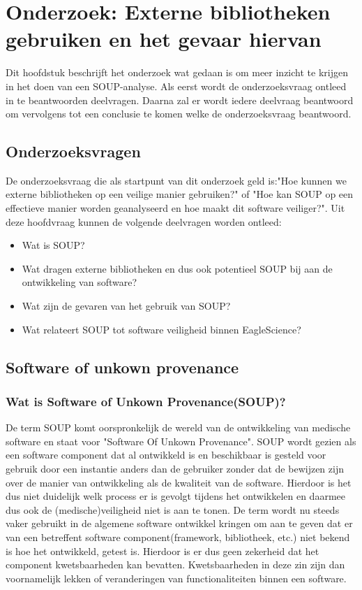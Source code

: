 \chapter{Onderzoek: Externe bibliotheken gebruiken en het gevaar hiervan}\label{ch:onderzoek:-SOUP-analyse}
Dit hoofdstuk beschrijft het onderzoek wat gedaan is om meer inzicht te krijgen in het doen van een SOUP-analyse. Als eerst wordt de onderzoeksvraag ontleed in te beantwoorden deelvragen. Daarna zal er wordt iedere deelvraag beantwoord om vervolgens tot een conclusie te komen welke de onderzoeksvraag beantwoord.

\section{Onderzoeksvragen} \label{sec:SOUPOnderzoeksvragen}
De onderzoeksvraag die als startpunt van dit onderzoek geld is:"Hoe kunnen we externe bibliotheken op een veilige manier gebruiken?" of "Hoe kan SOUP op een effectieve manier worden geanalyseerd en hoe maakt dit software veiliger?". Uit deze hoofdvraag kunnen de volgende deelvragen worden ontleed:
\begin{itemize}
    \item Wat is SOUP?
    \item Wat dragen externe bibliotheken en dus ook potentieel SOUP bij aan de ontwikkeling van software?
    \item Wat zijn de gevaren van het gebruik van SOUP?
    \item Wat relateert SOUP tot software veiligheid binnen EagleScience?
\end{itemize}


\section{Software of unkown provenance}\label{sec:software-of-unkown-provenance}

\subsection{Wat is Software of Unkown Provenance(SOUP)?}\label{subsec:wat-is-soup?2}
De term SOUP komt oorspronkelijk de wereld van de ontwikkeling van medische software en staat voor "Software Of Unkown Provenance".
SOUP wordt gezien als een software component dat al ontwikkeld is en beschikbaar is gesteld voor gebruik door een instantie anders dan de gebruiker zonder dat de bewijzen zijn over de manier van ontwikkeling als de kwaliteit van de software.
Hierdoor is het dus niet duidelijk welk process er is gevolgt tijdens het ontwikkelen en daarmee dus ook de (medische)veiligheid niet is aan te tonen.
De term wordt nu steeds vaker gebruikt in de algemene software ontwikkel kringen om aan te geven dat er van een betreffent software component(framework, bibliotheek, etc.) niet bekend is hoe het ontwikkeld, getest is.
Hierdoor is er dus geen zekerheid dat het component kwetsbaarheden kan bevatten.
Kwetsbaarheden in deze zin zijn dan voornamelijk lekken of veranderingen van functionaliteiten binnen een software.
